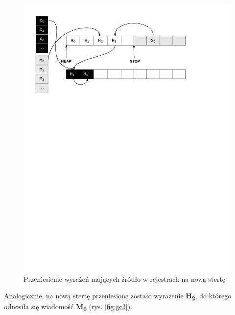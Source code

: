 \begin{figure}[h]
\centerline{\includegraphics[scale=0.75, clip, trim=10mm 185mm 45mm 10mm]{gc_2}}
\caption{Przeniesienie wyrażeń mających źródło w rejestrach na nową stertę}
\label{fig:gc2}
\end{figure}

Analogicznie, na nową stertę przeniesione zostało wyrażenie \textbf{H\textsubscript{2}}, do którego odnosiła się wiadomość \textbf{M\textsubscript{0}} (rys. \ref{fig:gc3}).

